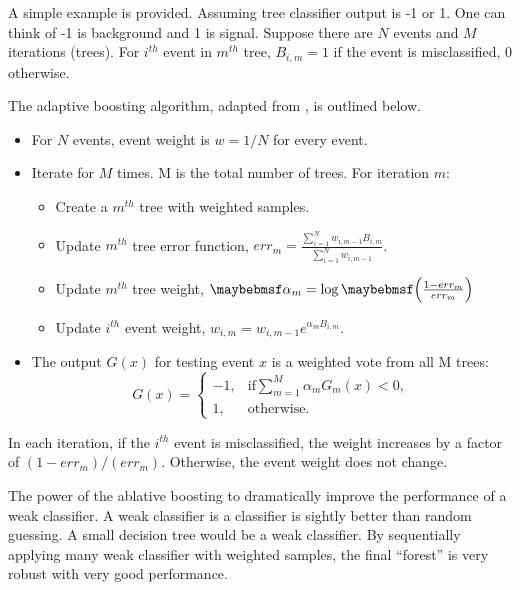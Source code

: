 A simple example is provided. Assuming tree classifier output is -1 or 1. One can think of -1 is background and 1 is signal. Suppose there are $N$ events and $M$ iterations (trees). For $i^{th}$ event in $m^{th}$ tree,  $B_{i,m} = 1$ if the event is misclassified, 0 otherwise.

The adaptive boosting algorithm, adapted from \cite{hastie2009elements},  is outlined below.

\begin{itemize}
  \item For $N$ events, event weight is $w = 1 / N$ for every event.
  \item Iterate for $M$ times. M is the total number of trees. For iteration $m$:
    \begin{itemize}
      \item Create a $m^{th}$ tree  with weighted samples.
      \item Update $m^{th}$ tree error function, $err_m = \frac{\sum_{i = 1}^{N} w_{i,m-1} B_{i,m} }{\sum_{i = 1}^{N}w_{i,m-1}}$.
      \item Update $m^{th}$ tree weight,  $\alpha_m = \log\parenths{\frac{1 - err_m}{err_m}}$
      \item Update $i^{th}$ event weight, $w_{i,m} = w_{i,m-1} e^{\alpha_m B_{i,m} }$.
    \end{itemize}
  \item The output $G(x)$ for testing event $x$ is a weighted vote from all M trees:
  \begin{equation}
    G(x)=
     \begin{cases}
      -1, & \mbox{if} \sum_{m=1}^{M}\alpha_mG_m(x) < 0 , \\
      1, & \mbox{otherwise}.
    \end{cases}
  \end{equation}
\end{itemize}

In each iteration, if the $i^{th}$ event is misclassified, the weight increases by a factor of $(1 - err_m)/(err_m)$. Otherwise, the event weight does not change.

The power of the ablative boosting to dramatically improve the performance of a weak classifier. A weak classifier is a classifier is sightly better than random guessing. A small decision tree would be a weak classifier. By sequentially applying many weak classifier with weighted samples, the final ``forest'' is very robust with very good performance.

